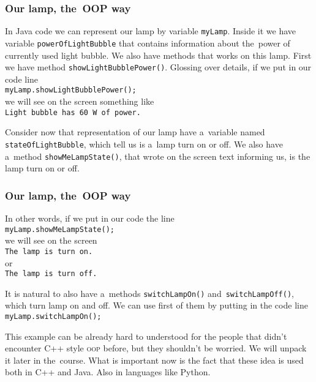 \documentclass[10pt,t]{beamer}
\begin{document}
\begin{frame}
  \frametitle{Our lamp, the~OOP way}


  In Java code we can represent our lamp by variable \texttt{myLamp}. Inside
  it we have variable \texttt{powerOfLightBubble} that contains information
  about the~power of currently used light bubble. We also have methods
  that works on this lamp. First we have method
  \texttt{showLightBubblePower()}. Glossing over details, if we put in our
  code line \\
  \texttt{myLamp.showLightBubblePower();} \\
  we will see on the screen something like \\
  \texttt{Light bubble has 60 W of power.}

  Consider now that representation of our lamp have a~variable named
  \texttt{stateOfLightBubble}, which tell us is a~lamp turn on or off.
  We also have a~method \texttt{showMeLampState()}, that wrote on the screen
  text informing us, is the lamp turn on or off.

\end{frame}





\begin{frame}
  \frametitle{Our lamp, the~OOP way}


  In other words, if we put in our code the line \\
  \texttt{myLamp.showMeLampState();} \\
  we will see on the screen \\
  \texttt{The lamp is turn on.} \\
  or \\
  \texttt{The lamp is turn off.}

  It is natural to also have a~methods \texttt{switchLampOn()}
  and~\texttt{switchLampOff()}, which turn lamp on and off. We can use
  first of them by putting in the code line \\
  \texttt{myLamp.switchLampOn();}

  This example can be already hard to understood for the people that didn't
  encounter C++ style \textsc{oop} before, but they shouldn't be worried.
  We will unpack it later in the~course. What is important now is the fact
  that these idea is used both in C++ and Java. Also in languages like
  Python.

\end{frame}
\end{document}
